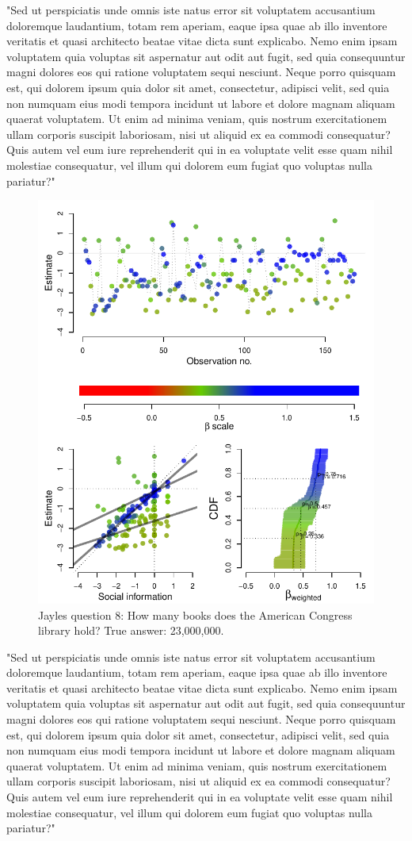 \documentclass[10pt,a4paper,twocolumn,lineno]{article}
\begin{document}
"Sed ut perspiciatis unde omnis iste natus error sit voluptatem accusantium doloremque laudantium, totam rem aperiam, eaque ipsa quae ab illo inventore veritatis et quasi architecto beatae vitae dicta sunt explicabo. Nemo enim ipsam voluptatem quia voluptas sit aspernatur aut odit aut fugit, sed quia consequuntur magni dolores eos qui ratione voluptatem sequi nesciunt. Neque porro quisquam est, qui dolorem ipsum quia dolor sit amet, consectetur, adipisci velit, sed quia non numquam eius modi tempora incidunt ut labore et dolore magnam aliquam quaerat voluptatem. Ut enim ad minima veniam, quis nostrum exercitationem ullam corporis suscipit laboriosam, nisi ut aliquid ex ea commodi consequatur? Quis autem vel eum iure reprehenderit qui in ea voluptate velit esse quam nihil molestiae consequatur, vel illum qui dolorem eum fugiat quo voluptas nulla pariatur?"

\begin{figure}[htbp]
	\centering\includegraphics[width=.5\textwidth]{../plots/jayles8.pdf}
	\caption{Jayles question 8: How many books does the American Congress library hold? True answer: 23,000,000.}\label{fig: Jayles question 8}
\end{figure}

"Sed ut perspiciatis unde omnis iste natus error sit voluptatem accusantium doloremque laudantium, totam rem aperiam, eaque ipsa quae ab illo inventore veritatis et quasi architecto beatae vitae dicta sunt explicabo. Nemo enim ipsam voluptatem quia voluptas sit aspernatur aut odit aut fugit, sed quia consequuntur magni dolores eos qui ratione voluptatem sequi nesciunt. Neque porro quisquam est, qui dolorem ipsum quia dolor sit amet, consectetur, adipisci velit, sed quia non numquam eius modi tempora incidunt ut labore et dolore magnam aliquam quaerat voluptatem. Ut enim ad minima veniam, quis nostrum exercitationem ullam corporis suscipit laboriosam, nisi ut aliquid ex ea commodi consequatur? Quis autem vel eum iure reprehenderit qui in ea voluptate velit esse quam nihil molestiae consequatur, vel illum qui dolorem eum fugiat quo voluptas nulla pariatur?"
\end{document}
